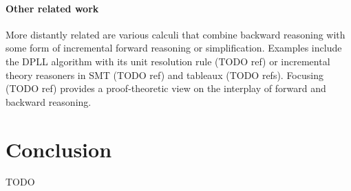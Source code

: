 \documentclass[runningheads]{llncs}
\begin{document}
\paragraph{Other related work}
More distantly related are various calculi that combine backward reasoning with some form of incremental forward reasoning or simplification.
Examples include the DPLL algorithm with its unit resolution rule (TODO ref) or incremental theory reasoners in SMT (TODO ref) and tableaux (TODO refs).
Focusing (TODO ref) provides a proof-theoretic view on the interplay of forward and backward reasoning.


\section{Conclusion}

TODO
\end{document}

